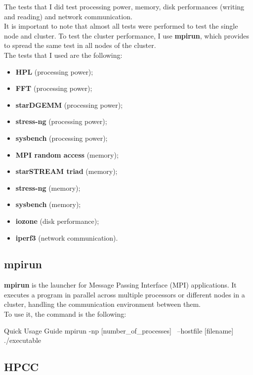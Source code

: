 The tests that I did test processing power, memory, disk performances (writing and reading) and network communication. \\
It is important to note that  almost all tests were performed to test the single node and cluster. To test the cluster performance, I use \textbf{mpirun}, which provides to spread the same test in all nodes of the cluster. \\
The tests that I used are the following:

\begin{itemize}
    \item \textbf{HPL} (processing power);
    \item \textbf{FFT} (processing power);
    \item \textbf{starDGEMM} (processing power);
    \item \textbf{stress-ng} (processing power);
    \item \textbf{sysbench} (processing power);
    \item \textbf{MPI random access} (memory);
    \item \textbf{starSTREAM triad} (memory);
    \item \textbf{stress-ng} (memory);
    \item \textbf{sysbench} (memory);
    \item \textbf{iozone} (disk performance);
    \item \textbf{iperf3} (network communication).
\end{itemize}

\subsection{mpirun}

\textbf{mpirun} is the launcher for Message Passing Interface (MPI) applications. It executes a program in parallel across multiple processors or different nodes in a cluster, handling the communication environment between them. \\
To use it, the command is the following:

\begin{codice}[style=bashstyle]{Quick Usage Guide}
    mpirun -np [number_of_processes] \
    --hostfile [filename] ./executable
\end{codice}

\subsection{HPCC}

